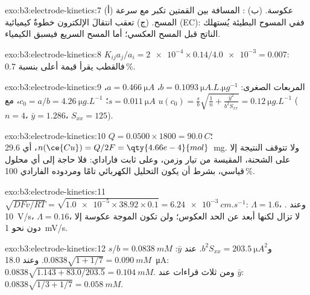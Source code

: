 \begin{solution}{exo:b3:electrode-kinetics:7}
(أ) عكوسة. (ب) : المسافة بين القمتين تكبر مع سرعة المسح.
(ج) تعقب انتقالَ الإلكترون خطوةٌ كيميائية (EC): ففي المسوح البطيئة يُستهلك
الناتج قبل المسح العكسي؛ أما المسح السريع فيسبق الكيمياء.
\end{solution}

\begin{solution}{exo:b3:electrode-kinetics:8}
$K_{ij}a_j/a_i = \num{2e-4} \times 0.14/\num{4.0e-3} = 0.007$: فالقطب يقرأ قيمة أعلى بنسبة 0.7\,\%.
\end{solution}

\begin{solution}{exo:b3:electrode-kinetics:9}
المربعات الصغرى: $b = \qty{0.1093}{\micro A.L.\micro g^{-1}}$، $a = \qty{0.466}{\micro A}$، $s = \qty{0.011}{\micro A}$؛ $c_0 = a/b =
\qty{4.26}{\micro g.L^{-1}}$، مع $u(c_0) = \frac sb\sqrt{\frac1n + \frac{\bar y^2}{b^2S_{xx}}} = \qty{0.12}{\micro g.L^{-1}}$
($n = 4$، $\bar y = 1.286$، $S_{xx} = 125$).
\end{solution}

\begin{solution}{exo:b3:electrode-kinetics:10}
$Q = 0.0500 \times 1800 = \qty{90.0}{C}$؛ $n(\ce{Cu}) = Q/2F = \qty{4.66e-4}{mol}$، أي \qty{29.6}{mg}. ولا
تتوقف النتيجة إلا على الشحنة، المقيسة من تيار وزمن، وعلى
ثابت فاراداي: فلا حاجة إلى أي محلول قياسي، بشرط أن يكون التحليل الكهربائي
تامًا ومردوده الفارادي 100\,\%.
\end{solution}

\begin{solution}{exo:b3:electrode-kinetics:11}
$\sqrt{DFv/RT} = \sqrt{\num{1.0e-5} \times 38.92 \times 0.1} = \qty{6.24e-3}{cm.s^{-1}}$: $\Lambda = 1.6$، .
وعند \qty{10}{V/s}، $\Lambda = 0.16$، لا تزال  لكنها أبعد عن الحد
العكوس؛ ولن تكون الموجة عكوسة إلا دون نحو \qty{1}{mV/s}.
\end{solution}

\begin{solution}{exo:b3:electrode-kinetics:12}
$s/b = \qty{0.0838}{mM}$ و$b^2S_{xx} = \qty{203.5}{\micro A^2}$. عند $\bar y$: $0.0838\sqrt{1 + 1/7} = \qty{0.090}{mM}$.
وعند \qty{18.0}{\micro A}: $0.0838\sqrt{1.143 + 83.0/203.5} = \qty{0.104}{mM}$. ومن ثلاث قراءات عند $\bar y$:
$0.0838\sqrt{1/3 + 1/7} = \qty{0.058}{mM}$.
\end{solution}

